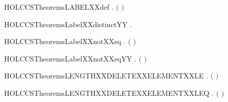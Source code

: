 \begin{SaveVerbatim}{HOLCCSTheoremsLABELXXdef}
\HOLTokenTurnstile{} \HOLSymConst{\HOLTokenForall{}}.  \ensuremath{(} \ensuremath{)} \HOLSymConst{\ensuremath{=}} 
\end{SaveVerbatim}
\newcommand{\HOLCCSTheoremsLABELXXdef}{\UseVerbatim{HOLCCSTheoremsLABELXXdef}}
\begin{SaveVerbatim}{HOLCCSTheoremsLabelXXdistinctYY}
\HOLTokenTurnstile{} \HOLSymConst{\HOLTokenForall{}} .   \HOLSymConst{\HOLTokenNotEqual{}}  
\end{SaveVerbatim}
\newcommand{\HOLCCSTheoremsLabelXXdistinctYY}{\UseVerbatim{HOLCCSTheoremsLabelXXdistinctYY}}
\begin{SaveVerbatim}{HOLCCSTheoremsLabelXXnotXXeq}
\HOLTokenTurnstile{} \HOLSymConst{\HOLTokenForall{}} . \ensuremath{(}  \HOLSymConst{\ensuremath{=}}  \ensuremath{)} \HOLSymConst{\HOLTokenEquiv{}} 
\end{SaveVerbatim}
\newcommand{\HOLCCSTheoremsLabelXXnotXXeq}{\UseVerbatim{HOLCCSTheoremsLabelXXnotXXeq}}
\begin{SaveVerbatim}{HOLCCSTheoremsLabelXXnotXXeqYY}
\HOLTokenTurnstile{} \HOLSymConst{\HOLTokenForall{}} . \ensuremath{(}  \HOLSymConst{\ensuremath{=}}  \ensuremath{)} \HOLSymConst{\HOLTokenEquiv{}} 
\end{SaveVerbatim}
\newcommand{\HOLCCSTheoremsLabelXXnotXXeqYY}{\UseVerbatim{HOLCCSTheoremsLabelXXnotXXeqYY}}
\begin{SaveVerbatim}{HOLCCSTheoremsLENGTHXXDELETEXXELEMENTXXLE}
\HOLTokenTurnstile{} \HOLSymConst{\HOLTokenForall{}} .    \HOLSymConst{\HOLTokenImp{}}  \ensuremath{(}  \ensuremath{)} \HOLSymConst{\HOLTokenLt{}}  
\end{SaveVerbatim}
\newcommand{\HOLCCSTheoremsLENGTHXXDELETEXXELEMENTXXLE}{\UseVerbatim{HOLCCSTheoremsLENGTHXXDELETEXXELEMENTXXLE}}
\begin{SaveVerbatim}{HOLCCSTheoremsLENGTHXXDELETEXXELEMENTXXLEQ}
\HOLTokenTurnstile{} \HOLSymConst{\HOLTokenForall{}} .  \ensuremath{(}  \ensuremath{)} \HOLSymConst{\HOLTokenLeq{}}  
\end{SaveVerbatim}
